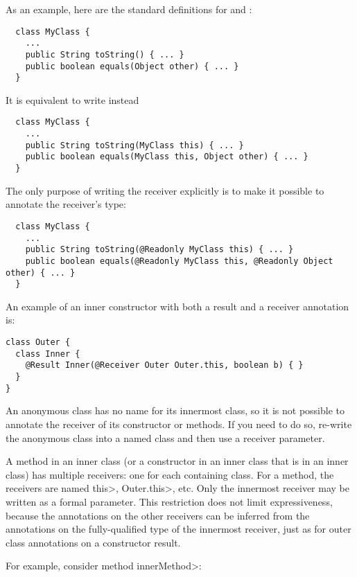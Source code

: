\documentclass[10pt]{article}
\begin{document}
\begin{enumerate}
  As an example, here are the standard definitions for  and :
\preverbnegspace
\begin{Verbatim}
  class MyClass {
    ...
    public String toString() { ... }
    public boolean equals(Object other) { ... }
  }
\end{Verbatim}

\noindent
It is equivalent to write instead

\preverbnegspace
\begin{Verbatim}
  class MyClass {
    ...
    public String toString(MyClass this) { ... }
    public boolean equals(MyClass this, Object other) { ... }
  }
\end{Verbatim}

\noindent
The only purpose of writing the receiver explicitly is to make it
possible to annotate the receiver's type:

\preverbnegspace
\begin{Verbatim}
  class MyClass {
    ...
    public String toString(@Readonly MyClass this) { ... }
    public boolean equals(@Readonly MyClass this, @Readonly Object other) { ... }
  }
\end{Verbatim}

An example of an inner constructor with both a result and a receiver
annotation is:

\preverbnegspace
\begin{Verbatim}
class Outer {
  class Inner {
    @Result Inner(@Receiver Outer Outer.this, boolean b) { }
  }
}
\end{Verbatim}

  An anonymous class has no name for its innermost class, so it is not
  possible to annotate the receiver of its constructor or methods.
  If you need to do so, re-write the
  anonymous class into a named class and then use a receiver parameter.

  A method in an inner class (or a constructor in an
  inner class that is in an inner class) has multiple receivers:  one for
  each containing class.  For a method, the receivers are named \<this>,
  \<Outer.this>, etc.  Only the innermost receiver may be written as a
  formal parameter.  This restriction does not limit expressiveness, because
  the annotations on the other receivers can be inferred
  from the annotations on the fully-qualified type of the innermost
  receiver, just as for outer class annotations on a constructor result.

  For example, consider method \<innerMethod>:


\end{enumerate}
\end{document}
